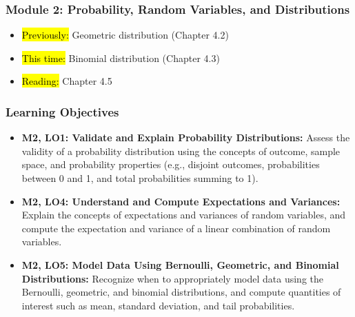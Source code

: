 
\begin{frame}
    \frametitle{Module 2: Probability, Random Variables, and Distributions}
    \begin{itemize}
        \item \hl{Previously: }Geometric distribution (Chapter 4.2)
        \item \hl{This time: }Binomial distribution (Chapter 4.3)
        \item \hl{Reading: }Chapter 4.5
    \end{itemize}

\end{frame}
\begin{frame}
    \frametitle{Learning Objectives}
    \begin{itemize}
        \item \textbf{M2, LO1: Validate and Explain Probability Distributions:} Assess the validity of a probability distribution using the concepts of outcome, sample space, and probability properties (e.g., disjoint outcomes, probabilities between 0 and 1, and total probabilities summing to 1).
        \item \textbf{M2, LO4: Understand and Compute Expectations and Variances:} Explain the concepts of expectations and variances of random variables, and compute the expectation and variance of a linear combination of random variables.
        \item \textbf{M2, LO5: Model Data Using Bernoulli, Geometric, and Binomial Distributions:} Recognize when to appropriately model data using the Bernoulli, geometric, and binomial distributions, and compute quantities of interest such as mean, standard deviation, and tail probabilities.
    \end{itemize}
\end{frame}
